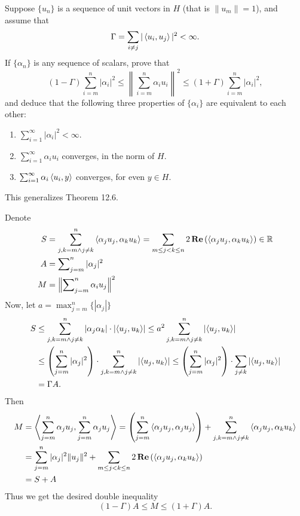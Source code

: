 \begin{enumerate}
\begin{excopy}
Suppose \(\{u_n\}\) is a sequence of unit vectors in $H$
(that is \(\|u_m\| = 1\)), and assume
that
\begin{equation*}
\Gamma = \sum_{i\neq j} |\left\langle u_i,u_j \right\rangle|^2 < \infty.
\end{equation*}
If \(\{\alpha_n\}\) is any sequence of scalars, prove that
\begin{equation*}
 (1 - \Gamma)\sum_{i=m}^n |\alpha_i|^2
 \leq \left\| \sum_{i=m}^n \alpha_i u_i \right\|^2
 \leq (1 + \Gamma) \sum_{i=m}^n |\alpha_i|^2 ,
\end{equation*}
and deduce that the following three properties of \(\{\alpha_i\}\)
are equivalent to each other:
\begin{enumerate}
\item \(\sum_{i=1}^\infty |\alpha_i|^2 < \infty\).
\item \(\sum_{i=1}^\infty \alpha_i u_i\) converges, in the norm of $H$.
\item \(\sum_{i=1}^\infty \alpha_i \left\langle u_i,y \right\rangle\) converges,
  for even \(y\in H\).
\end{enumerate}
This generalizes Theorem 12.6.
\end{excopy}
Denote
\begin{align*}
S &= \sum_{j,k=m \wedge j\neq k}^n \left\langle \alpha_j u_j, \alpha_k u_k \right\rangle
  = \sum_{m\leq j<k\leq n} 2\mathop{\bf Re}\nolimits\left(\left\langle \alpha_j u_j, \alpha_k u_k \right\rangle\right)
  \in \mathbb{R} \\
A &= \sum\nolimits_{j=m}^n |\alpha_j|^2 \\
M &= \left\| \sum\nolimits_{j=m}^n \alpha_i u_j \right\|^2
\end{align*}
Now, let \(a=\max_{j=m}^n\{|\alpha_j|\}\)
\begin{align*}
S
  &\leq \sum_{j,k=m \wedge j\neq k}^n |\alpha_j \alpha_k|\cdot
    \left|\left\langle u_j, u_k \right\rangle\right|
  \leq a^2 \sum_{j,k=m \wedge j\neq k}^n \left|\left\langle u_j, u_k \right\rangle\right| \\
  &\leq  \left(\sum_{j=m}^n |\alpha_j|^2\right)\cdot
        \sum_{j,k=m \wedge j\neq k}^n \left|\left\langle u_j, u_k \right\rangle\right|
  \leq  \left(\sum_{j=m}^n |\alpha_j|^2\right)\cdot
        \sum_{j\neq k} \left|\left\langle u_j, u_k \right\rangle\right| \\
  &= \Gamma A.
\end{align*}
Then
\begin{align*}
M
 &= \left\langle \sum_{j=m}^n \alpha_j u_j, \sum_{j=m}^n \alpha_j u_j \right\rangle
 = \left(\sum_{j=m}^n \left\langle \alpha_j u_j, \alpha_j u_j \right\rangle\right)
   + \sum_{j,k=m \wedge j\neq k}^n \left\langle \alpha_j u_j, \alpha_k u_k \right\rangle \\
 &= \sum_{j=m}^n |\alpha_j|^2\|u_j\|^2
    + \sum_{m\leq j<k\leq n}
      2\mathop{\bf Re}\nolimits\left(\left\langle \alpha_j u_j, \alpha_k u_k \right\rangle\right) \\
 &= S + A
\end{align*}
Thus we get the desired double inequality
\begin{equation*}
(1 - \Gamma)A \leq M \leq (1 + \Gamma)A.
\end{equation*}


\end{enumerate}
